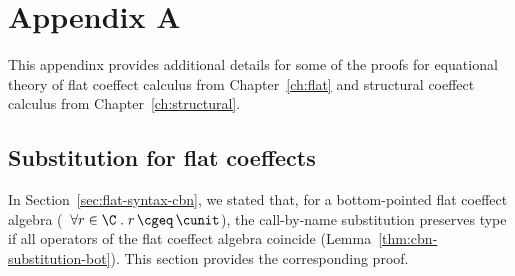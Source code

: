 
\chapter{Appendix A} 
\label{ch:appendix} 

This appendinx provides additional details for some of the proofs for equational theory
of flat coeffect calculus from Chapter~\ref{ch:flat} and structural coeffect calculus
from Chapter~\ref{ch:structural}.

\section{Substitution for flat coeffects}
\label{sec:appendix-flat-cbn}
In Section~\ref{sec:flat-syntax-cbn}, we stated that, for a bottom-pointed flat coeffect
algebra (\ie~$\forall r \in \C \;.\; r \,\cgeq\, \cunit $), the call-by-name substitution 
preserves type if all operators of the flat coeffect algebra coincide (Lemma~\ref{thm:cbn-substitution-bot}).
This section provides the corresponding proof.

